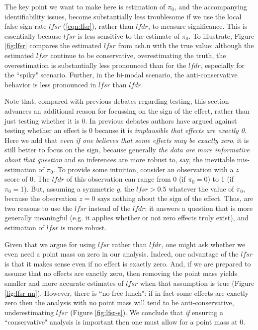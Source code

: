 \documentclass[11pt]{article}
\def\lfdr{\textit{lfdr}}
\def\lfsr{\textit{lfsr}}
\begin{document}
The key point we want to make here is estimation of $\pi_0$, and the accompanying identifiability issues,
 become substantially less troublesome if we use the local false sign rate $\lfsr$ (\ref{eqn:lfsr}), rather than $\lfdr$, to measure significance. 
 This is essentially because $\lfsr$ is less sensitive to the estimate of $\pi_0$.
To illustrate, Figure \ref{fig:lfsr} compares the estimated $\lfsr$ from ash.n with the true value: although the estimated $\lfsr$ continue to
be conservative, overestimating the truth, the overestimation is substantially less pronounced than for the $\lfdr$, especially for
the ``spiky" scenario. Further, in the bi-modal scenario, the anti-conservative behavior is less pronounced in $\lfsr$ than $\lfdr$.

Note that, compared with previous debates regarding testing, 
this section advances an additional reason for focussing on the sign of the effect, rather than just testing whether it is 0. 
In previous debates authors have argued against testing whether an effect is 0
because it is {\it implausible that effects are exactly 0}. Here we add that {\it even if one believes
that some effects may be exactly zero}, it is still better to focus on the sign, because generally {\it the data are more informative about that question}
and so inferences are more robust to, say, the inevitable mis-estimation of $\pi_0$.
To provide some intuition, consider an observation with a $z$ score of 0. The $\lfdr$ of this observation can range from 0 (if $\pi_0=0$)
to 1 (if $\pi_0=1$). But, assuming a symmetric $g$, the $\lfsr>0.5$ whatever the value of $\pi_0$, because the observation $z=0$ says
nothing about the sign of the effect.
Thus, are two reasons to use the $\lfsr$ instead of the $\lfdr$: it answers a question that is more generally meaningful (e.g. it applies
whether or not zero effects truly exist),  and estimation of $\lfsr$ is more robust. 
 
Given that we argue for using $\lfsr$ rather than $\lfdr$, one might ask whether we even need a point mass on zero in our analysis.
Indeed, one advantage of the $\lfsr$ is that it makes sense even if no effect is exactly zero. And, 
if we are prepared to assume that no effects are exactly zero, then removing the point mass 
yields smaller and more accurate estimates of $\lfsr$ when that assumption is true (Figure \ref{fig:lfsr-nn}). 
However, there is ``no free lunch":  if in fact some effects are exactly zero
then the analysis with no point mass will tend to be anti-conservative, underestimating $\lfsr$ (Figure \ref{fig:lfsr-s}). 
We conclude that {\it if} ensuring a ``conservative" analysis is important then one must allow for a point mass at 0. 
\end{document}
